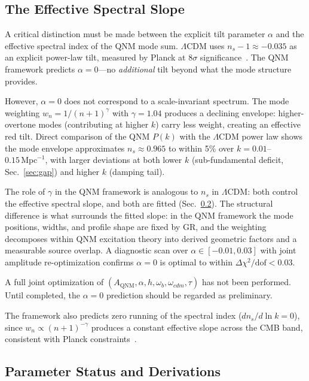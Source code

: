 \documentclass[aps,prd,twocolumn,superscriptaddress,showpacs,preprintnumbers,amsmath,amssymb,nofootinbib]{revtex4-2}
\newcommand{\lcdm}{$\Lambda$CDM}
\newcommand{\Mpc}{\,\mathrm{Mpc}}
\begin{document}
\subsection{The Effective Spectral Slope}
\label{sec:slope}

A critical distinction must be made between the explicit tilt parameter $\alpha$ and the effective spectral index of the QNM mode sum. \lcdm{} uses $n_s - 1 \approx -0.035$ as an explicit power-law tilt, measured by Planck at $8\sigma$ significance~\cite{Planck2020}. The QNM framework predicts $\alpha = 0$---no \emph{additional} tilt beyond what the mode structure provides.

However, $\alpha = 0$ does not correspond to a scale-invariant spectrum. The mode weighting $w_n = 1/(n+1)^\gamma$ with $\gamma = 1.04$ produces a declining envelope: higher-overtone modes (contributing at higher $k$) carry less weight, creating an effective red tilt. Direct comparison of the QNM $P(k)$ with the \lcdm{} power law shows the mode envelope approximates $n_s \approx 0.965$ to within 5\% over $k = 0.01$--$0.15\Mpc^{-1}$, with larger deviations at both lower $k$ (sub-fundamental deficit, Sec.~\ref{sec:gap}) and higher $k$ (damping tail).

The role of $\gamma$ in the QNM framework is analogous to $n_s$ in \lcdm: both control the effective spectral slope, and both are fitted (Sec.~\ref{sec:derivations}). The structural difference is what surrounds the fitted slope: in the QNM framework the mode positions, widths, and profile shape are fixed by GR, and the weighting decomposes within QNM excitation theory into derived geometric factors and a measurable source overlap. A diagnostic scan over $\alpha \in [-0.01, 0.03]$ with joint amplitude re-optimization confirms $\alpha = 0$ is optimal to within $\Delta\chi^2/\mathrm{dof} < 0.03$.

A full joint optimization of $(A_\mathrm{QNM}, \alpha, h, \omega_b, \omega_{cdm}, \tau)$ has not been performed. Until completed, the $\alpha = 0$ prediction should be regarded as preliminary.

The framework also predicts zero running of the spectral index ($dn_s/d\ln k = 0$), since $w_n \propto (n+1)^{-\gamma}$ produces a constant effective slope across the CMB band, consistent with Planck constraints~\cite{Planck2020}.


\subsection{Parameter Status and Derivations}
\label{sec:derivations}
\end{document}
